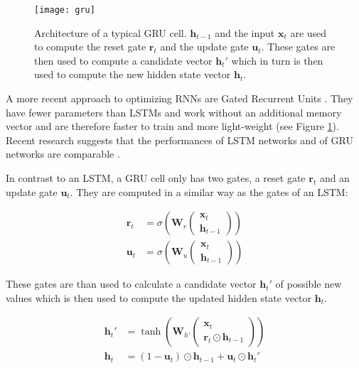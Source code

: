 \begin{figure}[t]
\centering
\texttt{[image: gru]}
\caption{Architecture of a typical GRU cell. \(\mathbf{h}_{t-1}\) and the input \(\mathbf{x}_t\) are used to compute the reset gate \(\mathbf{r}_t\) and the update gate \(\mathbf{u}_t\). These gates are then used to compute a candidate vector \(\mathbf{h}_t'\) which in turn is then used to compute the new hidden state vector \(\mathbf{h}_t\).}
\label{gru}
\end{figure}

A more recent approach to optimizing RNNs are Gated Recurrent Units \cite{gru}. They have fewer parameters than LSTMs and work without an additional memory vector and are therefore faster to train and more light-weight (see Figure \ref{gru}). Recent research suggests that the performances of LSTM networks and of GRU networks are comparable \cite{lstm_vs_gru}.

In contrast to an LSTM, a GRU cell only has two gates, a reset gate \(\mathbf{r}_t\) and an update gate \(\mathbf{u}_t\). They are computed in a similar way as the gates of an LSTM:

\begin{align*}
  \mathbf{r}_t &= \sigma \left(\mathbf{W}_r \begin{pmatrix} \mathbf{x}_t \\ \mathbf{h}_{t-1} \end{pmatrix} \right) \\
  \mathbf{u}_t &= \sigma \left(\mathbf{W}_u \begin{pmatrix} \mathbf{x}_t \\ \mathbf{h}_{t-1} \end{pmatrix} \right)
\end{align*}

These gates are than used to calculate a candidate vector \(\mathbf{h}_t'\) of possible new values which is then used to compute the updated hidden state vector \(\mathbf{h}_t\).

\begin{align*}
  \mathbf{h}_t' &= \tanh \left(\mathbf{W}_{h'} \begin{pmatrix} \mathbf{x}_t \\ \mathbf{r}_t \odot \mathbf{h}_{t-1} \end{pmatrix} \right) \\
  \mathbf{h}_t &= (1 - \mathbf{u}_t) \odot \mathbf{h}_{t-1} + \mathbf{u}_t \odot \mathbf{h}_t'
\end{align*}


